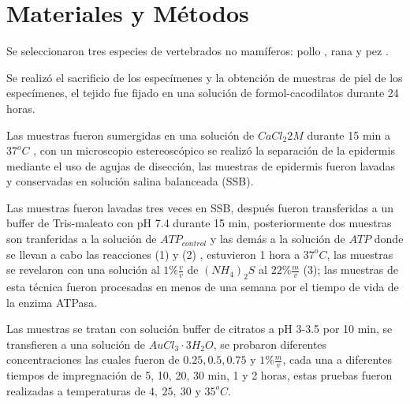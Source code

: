 \section*{Materiales y Métodos}


Se seleccionaron tres especies de vertebrados no mamíferos: pollo , rana  y pez .

Se realizó el sacrificio de los especímenes \cite{web:NOM} y la obtención de muestras de piel de los especímenes, el tejido fue fijado en una solución de formol-cacodilatos durante 24 horas.

Las muestras fueron sumergidas en una solución de $CaCl_{2} 2M$ durante 15 min a $37^oC$ \cite{article:epidermis}, con un microscopio estereoscópico se realizó la separación de la epidermis mediante el uso de agujas de disección, las muestras de epidermis fueron lavadas y conservadas en solución salina balanceada (SSB).


Las muestras fueron lavadas tres veces en SSB, después fueron transferidas a un buffer de Tris-maleato con pH 7.4 durante 15 min, posteriormente dos muestras son tranferidas a la solución de $ATP_{control}$ y las demás a la solución de $ATP$ donde se llevan a cabo las reacciones (1) y (2) \cite{article:ATPasaReaction} , estuvieron 1 hora a $37^oC$, las muestras se revelaron con una solución al $1\%\frac{v}{v}$ de $(NH_{4})_{2}S$ al $22\%\frac{m}{v}$ (3); las muestras de esta técnica fueron procesadas en menos de una semana por el tiempo de vida de la enzima ATPasa.







Las muestras se tratan con solución buffer de citratos a pH 3-3.5 por 10 min, se transfieren a una solución de $AuCl_{3}\cdot 3H_{2}O$, se probaron diferentes concentraciones las cuales fueron de $0.25,0.5,0.75$ y $1\% \frac{m}{v}$, cada una a diferentes tiempos de impregnación de 5, 10, 20, 30 min, 1 y 2 horas, estas pruebas fueron realizadas a temperaturas de $4,~25,~30$ y $35^oC$.

